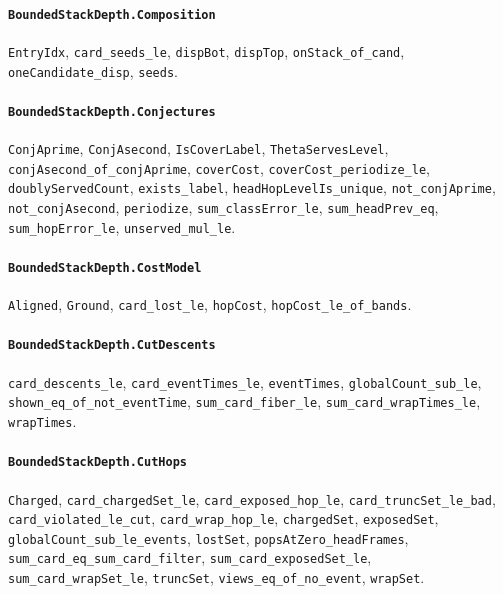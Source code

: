 \paragraph{\texttt{BoundedStackDepth.Composition}}
{\small\raggedright \texttt{EntryIdx}, \texttt{card\_seeds\_le}, \texttt{dispBot}, \texttt{dispTop}, \texttt{onStack\_of\_cand}, \texttt{oneCandidate\_disp}, \texttt{seeds}.\par}

\paragraph{\texttt{BoundedStackDepth.Conjectures}}
{\small\raggedright \texttt{ConjAprime}, \texttt{ConjAsecond}, \texttt{IsCoverLabel}, \texttt{ThetaServesLevel}, \texttt{conjAsecond\_of\_conjAprime}, \texttt{coverCost}, \texttt{coverCost\_periodize\_le}, \texttt{doublyServedCount}, \texttt{exists\_label}, \texttt{headHopLevelIs\_unique}, \texttt{not\_conjAprime}, \texttt{not\_conjAsecond}, \texttt{periodize}, \texttt{sum\_classError\_le}, \texttt{sum\_headPrev\_eq}, \texttt{sum\_hopError\_le}, \texttt{unserved\_mul\_le}.\par}

\paragraph{\texttt{BoundedStackDepth.CostModel}}
{\small\raggedright \texttt{Aligned}, \texttt{Ground}, \texttt{card\_lost\_le}, \texttt{hopCost}, \texttt{hopCost\_le\_of\_bands}.\par}

\paragraph{\texttt{BoundedStackDepth.CutDescents}}
{\small\raggedright \texttt{card\_descents\_le}, \texttt{card\_eventTimes\_le}, \texttt{eventTimes}, \texttt{globalCount\_sub\_le}, \texttt{shown\_eq\_of\_not\_eventTime}, \texttt{sum\_card\_fiber\_le}, \texttt{sum\_card\_wrapTimes\_le}, \texttt{wrapTimes}.\par}

\paragraph{\texttt{BoundedStackDepth.CutHops}}
{\small\raggedright \texttt{Charged}, \texttt{card\_chargedSet\_le}, \texttt{card\_exposed\_hop\_le}, \texttt{card\_truncSet\_le\_bad}, \texttt{card\_violated\_le\_cut}, \texttt{card\_wrap\_hop\_le}, \texttt{chargedSet}, \texttt{exposedSet}, \texttt{globalCount\_sub\_le\_events}, \texttt{lostSet}, \texttt{popsAtZero\_headFrames}, \texttt{sum\_card\_eq\_sum\_card\_filter}, \texttt{sum\_card\_exposedSet\_le}, \texttt{sum\_card\_wrapSet\_le}, \texttt{truncSet}, \texttt{views\_eq\_of\_no\_event}, \texttt{wrapSet}.\par}


